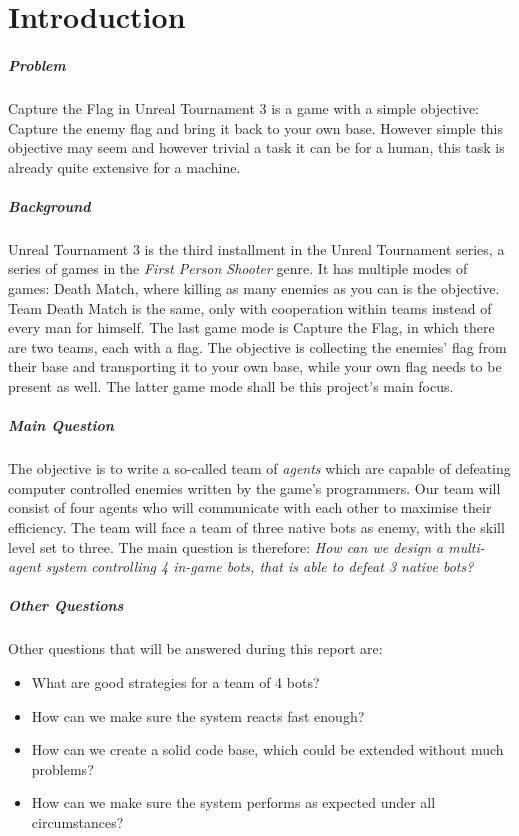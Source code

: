 \chapter{Introduction}

\paragraph{Problem}
Capture the Flag in Unreal Tournament 3 is a game with a simple objective: Capture the enemy flag and bring it back to your own base. However simple this objective may seem and however trivial a task it can be for a human, this task is already quite extensive for a machine.

\paragraph{Background}
Unreal Tournament 3 is the third installment in the Unreal Tournament series, a series of games in the \emph{First Person Shooter} genre. It has multiple modes of games: Death Match, where killing as many enemies as you can is the objective. Team Death Match is the same, only with cooperation within teams instead of every man for himself. The last game mode is Capture the Flag, in which there are two teams, each with a flag. The objective is collecting the enemies' flag from their base and transporting it to your own base, while your own flag needs to be present as well. The latter game mode shall be this project's main focus.

\paragraph{Main Question}
The objective is to write a so-called team of \emph{agents} which are capable of defeating computer controlled enemies written by the game's programmers. Our team will consist of four agents who will communicate with each other to maximise their efficiency. The team will face a team of three native bots as enemy, with the skill level set to three. The main question is therefore: \emph{How can we design a multi-agent system controlling 4 in-game bots, that is able to defeat 3 native bots?}

\paragraph{Other Questions}
Other questions that will be answered during this report are:
\begin{itemize}
	\item What are good strategies for a team of 4 bots? 
	\item How can we make sure the system reacts fast enough? 
	\item How can we create a solid code base, which could be extended without much problems? 
	\item How can we make sure the system performs as expected under all circumstances? 
\end{itemize}

